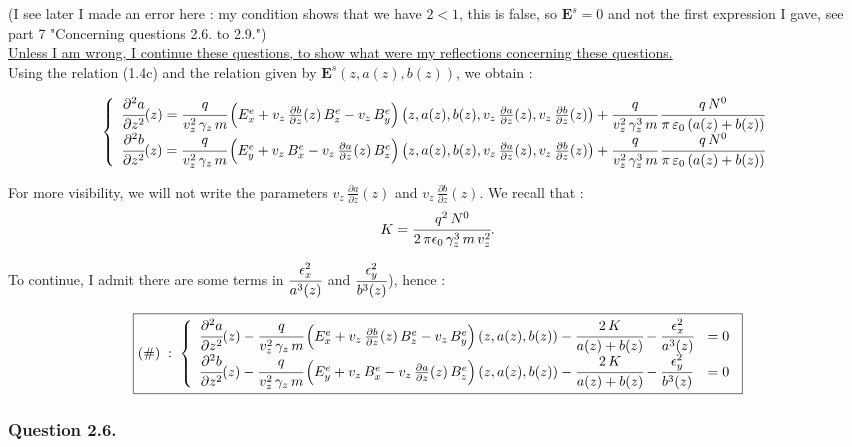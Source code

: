 \documentclass[10pt]{article}
\newcommand{\D}{{\partial}}
\begin{document}
(I see later I made an error here : my condition shows that we have $2<1$, this is false, so $\mathbf{E}^s = 0$ and not the first expression I gave, see part 7 "Concerning questions 2.6. to 2.9.") \\

\underline{Unless I am wrong, I continue these questions, to show what were my reflections concerning these questions.} \\

Using the relation (1.4c) and the relation given by $\mathbf{E}^s\left(z,a(z),b(z)\right)$, we obtain :

$$
\left\lbrace
    \begin{array}{ll}
\cfrac{\D^2 a}{\D z^2}(z) = \cfrac{q}{v_{z}^2\,\gamma_{z}\,m}\,\Big(E_{x}^{e} + v_z\,\frac{\D b}{\D z}(z)\,B_{z}^{e} - v_{z}\,B_{y}^{e}\Big)\left(z,a(z),b(z),v_z\,\frac{\D a}{\D z}(z),v_z\,\frac{\D b}{\D z}(z)\right) + \cfrac{q}{v_{z}^2\,\gamma_{z}^{3}\,m}\, \cfrac{q\,N^{0}}{\pi\,\varepsilon_{0}\,(a(z)+b(z))} \\
\cfrac{\D^2 b}{\D z^2}(z) = \cfrac{q}{v_{z}^2\,\gamma_{z}\,m}\,\Big(E_{y}^{e} + v_{z}\,B_{x}^{e} - v_z\,\frac{\D a}{\D z}(z)\,B_{z}^{e}\Big)\left(z,a(z),b(z),v_z\,\frac{\D a}{\D z}(z),v_z\,\frac{\D b}{\D z}(z)\right) + \cfrac{q}{v_{z}^2\,\gamma_{z}^{3}\,m}\, \cfrac{q\,N^{0}}{\pi\,\varepsilon_{0}\,(a(z)+b(z))}
    \end{array}
\right.
$$

For more visibility, we will not write the parameters $v_z\,\frac{\D a}{\D z}(z)$ and $v_z\,\frac{\D b}{\D z}(z)$. We recall that : 
$$K = \cfrac{q^2\,N^0}{2\,\pi\epsilon_{0}\,\gamma_{z}^3\,m\,v_z^2}.$$

To continue, I admit there are some terms in $\cfrac{\epsilon_{x}^2}{a^3(z)}$ and $\cfrac{\epsilon_{y}^2}{b^3(z)}$), hence :

$$\boxed{(\#)\;:\;
\left\lbrace
    \begin{array}{ll}
\cfrac{\D^2 a}{\D z^2}(z) - \cfrac{q}{v_{z}^2\,\gamma_{z}\,m}\,\Big(E_{x}^{e} + v_z\,\frac{\D b}{\D z}(z)\,B_{z}^{e} - v_{z}\,B_{y}^{e}\Big)\left(z,a(z),b(z)\right) -  \cfrac{2\,K}{a(z)+b(z)} - \cfrac{\epsilon_{x}^2}{a^3(z)} &= 0 \\
\cfrac{\D^2 b}{\D z^2}(z) - \cfrac{q}{v_{z}^2\,\gamma_{z}\,m}\,\Big(E_{y}^{e} + v_{z}\,B_{x}^{e} - v_z\,\frac{\D a}{\D z}(z)\,B_{z}^{e}\Big)\left(z,a(z),b(z)\right) - \cfrac{2\,K}{a(z)+b(z)} - \cfrac{\epsilon_{y}^2}{b^3(z)} &= 0 
    \end{array}
\right.}
$$


\subsubsection{Question 2.6.}
\end{document}

